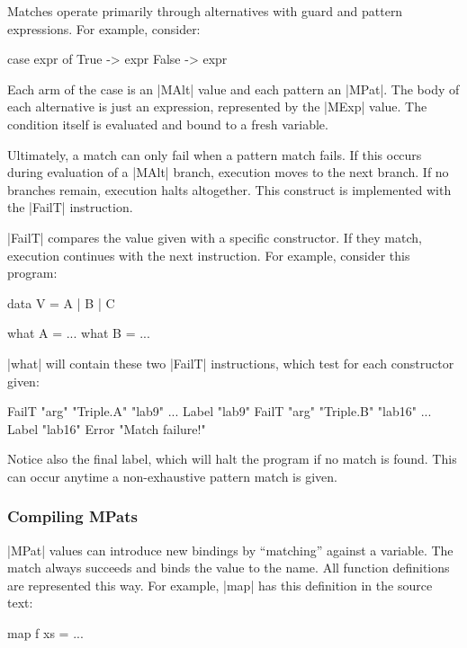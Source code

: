 \documentclass[11pt]{article}
\begin{document}
Matches operate primarily through alternatives with guard and pattern expressions. For
example, consider:

\begin{code}
  case expr of
      True -> expr
      False -> expr
\end{code}

Each arm of the case is an |MAlt| value and each pattern an
|MPat|. The body of each alternative is just an expression,
represented by the |MExp| value. The condition itself is evaluated and
bound to a fresh variable.

Ultimately, a match can only fail when a pattern match fails. If this
occurs during evaluation of a |MAlt| branch, execution moves to the
next branch. If no branches remain, execution halts altogether. This
construct is implemented with the |FailT| instruction. 

|FailT| compares the value given with a
specific constructor. If they match, execution continues with the
next instruction. For example, consider this program:

\begin{code}
data V = A | B | C

what A = ...
what B = ...
\end{code}

\noindent
|what| will contain these two |FailT| instructions, which test for
each constructor given:

\begin{code}
  FailT "arg" "Triple.A" "lab9"
  ...
  Label "lab9"
  FailT "arg" "Triple.B" "lab16"
  ...
  Label "lab16"
  Error "Match failure!"
\end{code}

\noindent
Notice also the final label, which will halt the program if no match
is found. This can occur anytime a non-exhaustive pattern match is given.

\subsubsection{Compiling MPats}

|MPat| values can introduce new bindings by ``matching'' against a
variable. The match always succeeds and binds the value to the
name. All function definitions are represented this way. For example,
|map| has this definition in the source text:

\begin{code}
  map f xs = ...
\end{code}
\end{document}
